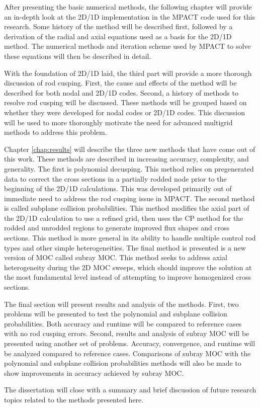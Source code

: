 After presenting the basic numerical methods, the following chapter will provide an in-depth look at the 2D/1D implementation in the MPACT code used for this research.  Some history of the method will be described first, followed by a derivation of the radial and axial equations used as a basis for the 2D/1D method.  The numerical methods and iteration scheme used by MPACT to solve these equations will then be described in detail.

With the foundation of 2D/1D laid, the third part will provide a more thorough discussion of rod cusping.  First, the cause and effects of the method will be described for both nodal and 2D/1D codes.  Second, a history of methods to resolve rod cusping will be discussed.  These methods will be grouped based on whether they were developed for nodal codes or 2D/1D codes.  This discussion will be used to more thoroughly motivate the need for advanced multigrid methods to address this problem.

Chapter \ref{chap:results} will describe the three new methods that have come out of this work.  These methods are described in increasing accuracy, complexity, and generality.  The first is polynomial decusping.  This method relies on pregenerated data to correct the cross sections in a partially rodded node prior to the beginning of the 2D/1D calculations.  This was developed primarily out of immediate need to address the rod cusping issue in MPACT.  The second method is called subplane collision probabilities.  This method modifies the axial part of the 2D/1D calculation to use a refined grid, then uses the CP method for the rodded and unrodded regions to generate improved flux shapes and cross sections.  This method is more general in its ability to handle multiple control rod types and other simple heterogeneities.  The final method is presented is a new version of MOC called subray MOC.  This method seeks to address axial heterogeneity during the 2D MOC sweeps, which should improve the solution at the most fundamental level instead of attempting to improve homogenized cross sections.

The final section will present results and analysis of the methods.  First, two problems will be presented to test the polynomial and subplane collision probabilities.  Both accuracy and runtime will be compared to reference cases with no rod cusping errors.  Second, results and analysis of subray MOC will be presented using another set of problems.  Accuracy, convergence, and runtime will be analyzed compared to reference cases.  Comparisons of subray MOC with the polynomial and subplane collision probabilities methods will also be made to show improvements in accuracy achieved by subray MOC.

The dissertation will close with a summary and brief discussion of future research topics related to the methods presented here.